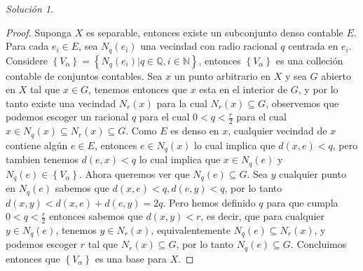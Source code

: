 \documentclass[notitlepage]{report}
\theoremstyle{definition}
\theoremstyle{remark}
\newtheorem*{sol}{Solución}
\newcommand{\set}[1]{\left\lbrace #1 \right\rbrace}
\newcommand{\QQ}{\mathbb{Q}}
\newcommand{\NN}{\mathbb{N}}
\begin{document}
\begin{sol}
\begin{proof}
		Suponga $ X $ es separable, entonces existe un subconjunto denso contable $ E $. Para cada $ e_i \in E $, sea $ N_q(e_i) $ una vecindad con radio racional $ q $ centrada en $ e_i $. Considere $ \set{V_\alpha} = \set{N_q(e_i) | q \in \QQ, i \in \NN} $, entonces $ \set{V_\alpha} $ es una colleción contable de conjuntos contables. Sea $ x $ un punto arbitrario en $ X $ y sea $ G $ abierto en $ X $ tal que $ x \in G $, tenemos entonces que $ x $ esta en el interior de $ G $, y por lo tanto existe una vecindad $ N_r(x) $ para la cual $ N_r(x) \subseteq G $, observemos que podemos escoger un racional $ q $ para el cual $ 0 < q < \frac{r}{2} $ para el cual $ x \in N_q(x) \subseteq N_r(x) \subseteq G $. Como $ E $ es denso en $ x $, cualquier vecindad de $ x $ contiene algún $ e \in E $, entonces $ e \in N_q(x) $ lo cual implica que $ d(x,e) < q  $, pero tambien tenemos $ d(e,x)  < q $ lo cual implica que $ x \in N_q(e) $ y $ N_q(e) \in \set{V_\alpha} $. Ahora queremos ver que $ N_q(e) \subseteq G $. Sea $ y $ cualquier punto en $ N_q(e) $ sabemos que $ d(x,e) <q, d(e,y) <q $, por lo tanto $ d(x,y) < d(x,e) + d(e,y) = 2q $. Pero hemos definido $ q $ para que cumpla $ 0 < q < \frac{r}{2} $ entonces sabemos que $ d(x,y) < r $, es decir, que para cualquier $ y \in N_q(e) $, tenemos $ y \in N_r(x) $, equivalentemente $ N_q(e) \subseteq N_r(x) $, y podemos escoger $ r $ tal que $ N_r(x) \subseteq G $, por lo tanto $ N_q(e) \subseteq G $.
		Concluimos entonces que $ \set{V_\alpha} $ es una base para $ X $.
	\end{proof}
\end{sol}
\end{document}
